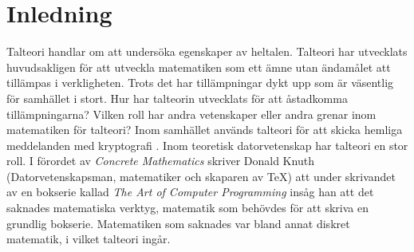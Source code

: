 \section*{Inledning}
Talteori handlar om att undersöka egenskaper av heltalen. Talteori har utvecklats huvudsakligen för att utveckla matematiken som ett ämne utan ändamålet att tillämpas i verkligheten. Trots det har tillämpningar dykt upp som är väsentlig för samhället i stort. Hur har talteorin utvecklats för att åstadkomma tillämpningarna? Vilken roll har andra vetenskaper eller andra grenar inom matematiken för talteori? Inom samhället används talteori för att skicka hemliga meddelanden med kryptografi \cite{crypto}. Inom teoretisk datorvetenskap har talteori en stor roll. I förordet av \textit{Concrete Mathematics} skriver Donald Knuth \cite{concrete:knuth} (Datorvetenskapsman, matematiker och skaparen av \TeX) att under skrivandet av en bokserie kallad \textit{The Art of Computer Programming} insåg han att det saknades matematiska verktyg, matematik som behövdes för att skriva en grundlig bokserie. Matematiken som saknades var bland annat diskret matematik, i vilket talteori ingår.